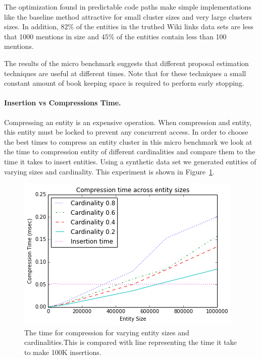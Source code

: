 The optimization found in predictable code paths make simple implementations
like the baseline method attractive for small cluster sizes and very large clusters sizes.
In addition, $82\%$ of the entities in the truthed Wiki links data sets are less
that 1000 mentions in size and $45\%$ of the entities contain less than 100
mentions.

The results of the micro benchmark suggests that different proposal estimation
techniques are useful at different times.
Note that for these techniques a small constant amount of book keeping space is required to perform early stopping.


\paragraph{Insertion vs Compressions Time.}
Compressing an entity is an expensive operation.
When compression and entity, this entity must be locked to prevent any concurrent access.
In order to choose the best times to compress an entity cluster in this 
micro benchmark we look at the time to compression entity of different cardinalities
and compare them to the time it takes to insert entities. 
Using a synthetic data set we generated entities of varying sizes and cardinality.
This experiment is shown in Figure~\ref{fig:compression-v-insertion}. 


\begin{figure}
\centering
\includegraphics[width=\columnwidth]{media/compression-entitysize.png}
\caption{The time for compression for varying entity sizes and cardinalities.This is compared with line representing the time it take to make 100K insertions. }
\label{fig:compression-v-insertion}
\end{figure}

